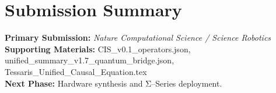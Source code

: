 \documentclass[11pt,a4paper]{article}
\begin{document}
\section*{Submission Summary}
\textbf{Primary Submission:} \emph{Nature Computational Science / Science Robotics} \\
\textbf{Supporting Materials:} CIS\_v0.1\_operators.json, unified\_summary\_v1.7\_quantum\_bridge.json, Tessaris\_Unified\_Causal\_Equation.tex \\
\textbf{Next Phase:} Hardware synthesis and Σ–Series deployment.
\end{document}
